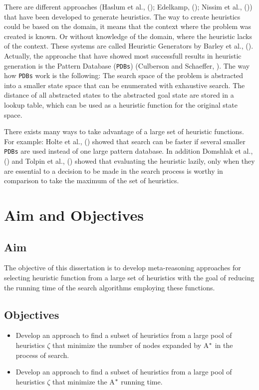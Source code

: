 There are different approaches (Haslum et al., (\citeyear{haslum2007domain}); Edelkamp, (\citeyear{edelkamp2007automated}); Nissim et al., (\citeyear{nissim2011computing})) that have been developed to generate heuristics. The way to create heuristics could be based on the domain, it means that the context where the problem was created is known. Or without knowledge of the domain, where the heuristic lacks of the context. These systems are called Heuristic Generators by Barley et al., (\citeyear{BarleySantiagoOver}). Actually, the approache that have showed most successfull results in heuristic generation is the Pattern Database (\texttt{PDBs}) (Culberson and Schaeffer, \citeyear{culberson1998pattern}). The way how \texttt{PDBs} work is the following: The search space of the problem is abstracted into a smaller state space that can be enumerated with exhaustive search. The distance of all abstracted states to the abstracted goal state are stored in a lookup table, which can be used as a heuristic function for the original state space.

There exists many ways to take advantage of a large set of heuristic functions. For example: Holte et al., (\citeyear{holte2006maximizing}) showed that search can be faster if several smaller \texttt{PDBs} are used instead of one large pattern database. In addition Domshlak et al., (\citeyear{domshlak2010max}) and Tolpin et al.,  (\citeyear{tolpin2013towards}) showed that evaluating the heuristic lazily, only when they are essential to a decision to be made in the search process is worthy in comparison to take the maximum of the set of heuristics.
\section{Aim and Objectives}
\subsection{Aim}
\noindent
The objective of this dissertation is to develop meta-reasoning approaches for selecting heuristic function from a large set of heuristics with the goal of reducing the running time of the search algorithms employing these functions.

\subsection{Objectives}
\noindent

\begin{itemize}
  \item Develop an approach to find a subset of heuristics from a large pool of heuristics $\zeta$ that minimize the number of nodes expanded by A$\sp{*}$ in the process of search.
  
  \item Develop an approach to find a subset of heuristics from a large pool of heuristics $\zeta$ that minimize the A$\sp{*}$ running time.

\end{itemize}
